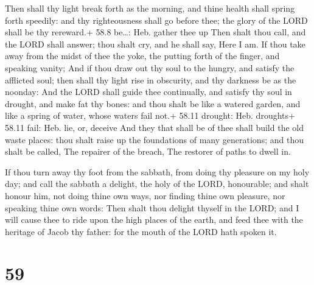  Then shall thy light break forth as the morning, and
thine health shall spring forth speedily: and thy righteousness shall go
before thee; the glory of the LORD shall be thy rereward.+ 58.8
be\ldots: Heb. gather thee up  Then shalt thou call, and the
LORD shall answer; thou shalt cry, and he shall say, Here I am. If thou
take away from the midst of thee the yoke, the putting forth of the
finger, and speaking vanity;  And if thou draw out thy soul
to the hungry, and satisfy the afflicted soul; then shall thy light rise
in obscurity, and thy darkness be as the noonday:  And the
LORD shall guide thee continually, and satisfy thy soul in drought, and
make fat thy bones: and thou shalt be like a watered garden, and like a
spring of water, whose waters fail not.+ 58.11 drought: Heb. droughts+
58.11 fail: Heb. lie, or, deceive  And they that shall be
of thee shall build the old waste places: thou shalt raise up the
foundations of many generations; and thou shalt be called, The repairer
of the breach, The restorer of paths to dwell in.

 If thou turn away thy foot from the sabbath, from doing
thy pleasure on my holy day; and call the sabbath a delight, the holy of
the LORD, honourable; and shalt honour him, not doing thine own ways,
nor finding thine own pleasure, nor speaking thine own words:
 Then shalt thou delight thyself in the LORD; and I will
cause thee to ride upon the high places of the earth, and feed thee with
the heritage of Jacob thy father: for the mouth of the LORD hath spoken
it.

\hypertarget{section-58}{%
\section{59}\label{section-58}}

